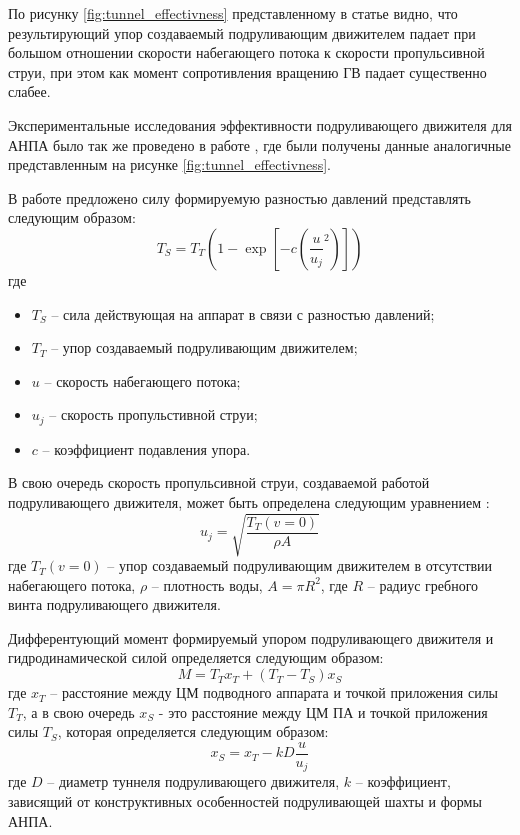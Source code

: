 По рисунку \ref{fig:tunnel_effectivness} представленному в статье \cite{chislett1966influence} видно, что результирующий упор создаваемый подруливающим движителем падает при большом отношении скорости набегающего потока к скорости пропульсивной струи, при этом как момент сопротивления вращению ГВ падает существенно слабее.

Экспериментальные исследования эффективности подруливающего движителя для АНПА было так же проведено в работе \cite{beveridge1972design}, где были получены данные аналогичные представленным на рисунке \ref{fig:tunnel_effectivness}.

В работе \cite{palmer2009analysis} предложено силу формируемую разностью давлений представлять следующим образом:
\begin{equation}
    \label{eq:thrust_tunnel}
	T_S = T_T (1 - \exp \left[ -c \left( \frac{u}{u_j}^2 \right) \right])
\end{equation}
\noindent где
\begin{itemize}
	\item $T_S$ -- сила действующая на аппарат в связи с разностью давлений;
	\item $T_T$ -- упор создаваемый подруливающим движителем;
	\item $u$ -- скорость набегающего потока;
	\item $u_j$ -- скорость пропульстивной струи;
	\item $c$ -- коэффициент подавления упора.
\end{itemize}

В свою очередь скорость пропульсивной струи, создаваемой работой подруливающего движителя, может быть определена следующим уравнением \cite{palmer2009analysis}:
\begin{equation}
    \label{eq:jetflow_speed}
	u_j = \sqrt{\frac{T_T(v=0)}{\rho A}}
\end{equation}
\noindent где $T_T(v=0)$ -- упор создаваемый подруливающим движителем в отсутствии набегающего потока, $\rho$ -- плотность воды, $A=\pi R^2$, где $R$ -- радиус гребного винта подруливающего движителя.

Дифферентующий момент формируемый упором подруливающего движителя и гидродинамической силой определяется следующим образом:
\begin{equation*}
	M = T_T x_T + (T_T-T_S)x_S
\end{equation*}
\noindent где $x_T$ -- расстояние между ЦМ подводного аппарата и точкой приложения силы $T_T$, а в свою очередь $x_S$ - это расстояние между ЦМ ПА и точкой приложения силы $T_S$, которая определяется следующим образом:
\begin{equation*}
	x_S = x_T - kD\frac{u}{u_j}
\end{equation*}
\noindent где $D$ -- диаметр туннеля подруливающего движителя, $k$ -- коэффициент, зависящий от конструктивных особенностей подруливающей шахты и формы АНПА.

